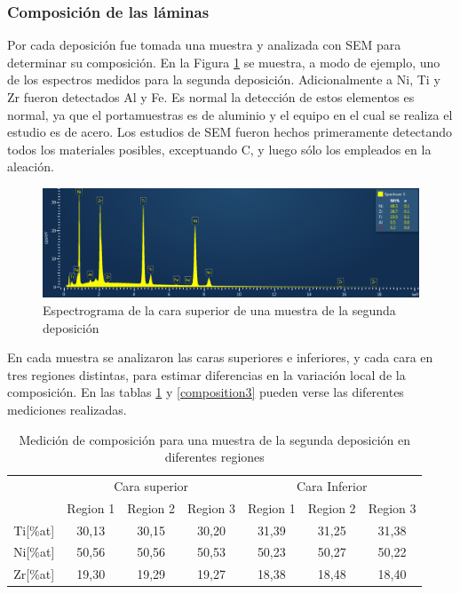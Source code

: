 \documentclass[12pt]{article}
\theoremstyle{definition}
\theoremstyle{remark}
\begin{document}
\subsubsection{Composición de las láminas}

Por cada deposición fue tomada una muestra y analizada con SEM para determinar su composición. En la Figura \ref{dep2} se muestra, a modo de ejemplo, uno de los espectros medidos para la segunda deposición. Adicionalmente a Ni, Ti y Zr fueron detectados Al y Fe. Es normal la detección de estos elementos es normal, ya que el portamuestras es de aluminio y el equipo en el cual se realiza el estudio es de acero. Los estudios de SEM fueron hechos primeramente detectando todos los materiales posibles, exceptuando C, y luego sólo los empleados en la aleación.

 \begin{figure}[H]
 	\centering
	\includegraphics[scale=0.5]{img/dep2.png}
 	\caption{Espectrograma de la cara superior de una muestra de la segunda deposición}
	\label{dep2}
\end{figure} 

En cada muestra se analizaron las caras superiores e inferiores, y cada cara en tres regiones distintas, para estimar diferencias en la variación local de la composición. En las tablas \ref{composition2} y \ref{composition3} pueden verse las diferentes mediciones realizadas.

\begin{table}[H]
\begin{tabular}{c|c|c|c|c|c|c|}
\cline{2-7}
\multicolumn{1}{l|}{} & \multicolumn{3}{c|}{Cara superior} & \multicolumn{3}{c|}{Cara Inferior} \\ \cline{2-7} 
\multicolumn{1}{l|}{} & Region 1 & Region 2 & Region 3 & Region 1 & Region 2 & Region 3 \\ \hline
\multicolumn{1}{|c|}{Ti{[}\%at{]}} & 30,13 & 30,15 & 30,20 & 31,39 & 31,25 & 31,38 \\ \hline
\multicolumn{1}{|c|}{Ni{[}\%at{]}} & 50,56 & 50,56 & 50,53 & 50,23 & 50,27 & 50,22 \\ \hline
\multicolumn{1}{|c|}{Zr{[}\%at{]}} & 19,30 & 19,29 & 19,27 & 18,38 & 18,48 & 18,40 \\ \hline
\end{tabular}
\caption{Medición de composición para una muestra de la segunda deposición en diferentes regiones}
\label{composition2}
\end{table}
\end{document}
